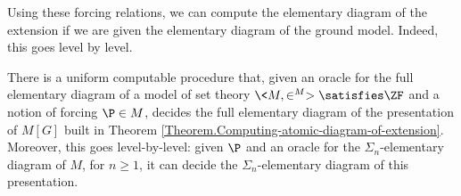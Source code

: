\documentclass{amsart}
\begin{document}
Using these forcing relations, we can compute the elementary diagram of the extension if we are given the elementary diagram of the ground model. Indeed, this goes level by level.

\begin{theorem}\label{Theorem.Computing-diagram-of-extension}
There is a uniform computable procedure that, given an oracle for the full elementary diagram of a model of set theory $\<M,\in^M>\satisfies\ZF$ and a notion of forcing $\P\in M$, decides the full elementary diagram of the presentation of $M[G]$ built in Theorem \ref{Theorem.Computing-atomic-diagram-of-extension}.  Moreover, this goes level-by-level: given $\P$ and an oracle for the $\Sigma_n$-elementary diagram of $M$, for $n \ge 1$, it can decide the $\Sigma_n$-elementary diagram of this presentation.
\end{theorem}
\end{document}
